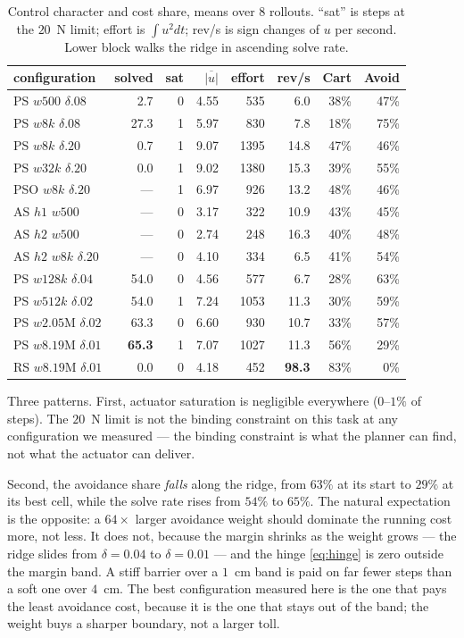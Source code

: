 \documentclass[conference]{IEEEtran}
\begin{document}
\begin{table}[t]
\caption{Control character and cost share, means over 8 rollouts. ``sat'' is
steps at the $20$~N limit; effort is $\int u^2 dt$; rev/s is sign changes of $u$
per second. Lower block walks the ridge in ascending solve rate.}
\label{tab:costshare}
\centering
\small
\setlength{\tabcolsep}{4pt}
\begin{tabular}{@{}lrrrrrrr@{}}
\toprule
configuration & solved & sat & $\overline{|u|}$ & effort & rev/s & Cart & Avoid \\
\midrule
PS $w500$ $\delta.08$    & 2.7 & 0 & 4.55 & 535  & 6.0  & 38\% & 47\% \\
PS $w8k$ $\delta.08$     & 27.3 & 1 & 5.97 & 830  & 7.8  & 18\% & 75\% \\
PS $w8k$ $\delta.20$     & 0.7 & 1 & 9.07 & 1395 & 14.8 & 47\% & 46\% \\
PS $w32k$ $\delta.20$    & 0.0 & 1 & 9.02 & 1380 & 15.3 & 39\% & 55\% \\
PSO $w8k$ $\delta.20$    & --- & 1 & 6.97 & 926  & 13.2 & 48\% & 46\% \\
AS $h1$ $w500$           & --- & 0 & 3.17 & 322  & 10.9 & 43\% & 45\% \\
AS $h2$ $w500$           & --- & 0 & 2.74 & 248  & 16.3 & 40\% & 48\% \\
AS $h2$ $w8k$ $\delta.20$& --- & 0 & 4.10 & 334  & 6.5  & 41\% & 54\% \\
\midrule
PS $w128k$ $\delta.04$   & 54.0 & 0 & 4.56 & 577  & 6.7  & 28\% & 63\% \\
PS $w512k$ $\delta.02$   & 54.0 & 1 & 7.24 & 1053 & 11.3 & 30\% & 59\% \\
PS $w2.05\text{M}$ $\delta.02$ & 63.3 & 0 & 6.60 & 930  & 10.7 & 33\% & 57\% \\
PS $w8.19\text{M}$ $\delta.01$ & \textbf{65.3} & 1 & 7.07 & 1027 & 11.3 & 56\% & 29\% \\
RS $w8.19\text{M}$ $\delta.01$ & 0.0 & 0 & 4.18 & 452  & \textbf{98.3} & 83\% & 0\% \\
\bottomrule
\end{tabular}
\end{table}

Three patterns. First, actuator saturation is negligible everywhere
($0$--$1\%$ of steps). The $20$~N limit is not the binding constraint on this
task at any configuration we measured --- the binding constraint is what the
planner can find, not what the actuator can deliver.

Second, the avoidance share \emph{falls} along the ridge, from $63\%$ at its
start to $29\%$ at its best cell, while the solve rate rises from $54\%$ to
$65\%$. The natural expectation is the opposite: a $64\times$ larger avoidance
weight should dominate the running cost more, not less. It does not, because the
margin shrinks as the weight grows --- the ridge slides from $\delta = 0.04$ to
$\delta = 0.01$ --- and the hinge \eqref{eq:hinge} is zero outside the margin
band. A stiff barrier over a $1$~cm band is paid on far fewer steps than a soft
one over $4$~cm. The best configuration measured here is the one that pays the
least avoidance cost, because it is the one that stays out of the band; the
weight buys a sharper boundary, not a larger toll.
\end{document}
